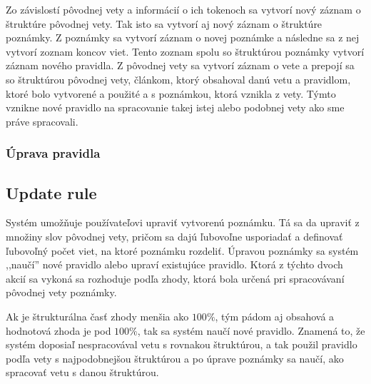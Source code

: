 Zo závislostí pôvodnej vety a informácií o ich tokenoch sa vytvorí nový záznam o štruktúre pôvodnej vety. Tak isto sa vytvorí aj nový záznam o štruktúre poznámky. Z poznámky sa vytvorí záznam o novej poznámke a následne sa z nej vytvorí zoznam koncov viet. Tento zoznam spolu so štruktúrou poznámky vytvorí záznam nového pravidla. Z pôvodnej vety sa vytvorí záznam o vete a prepojí sa so štruktúrou pôvodnej vety, článkom, ktorý obsahoval danú vetu a pravidlom, ktoré bolo vytvorené a použité a s poznámkou, ktorá vznikla z vety. Týmto vznikne nové pravidlo na spracovanie takej istej alebo podobnej vety ako sme práve spracovali.



%
%
{
	\subsubsection{Úprava pravidla}
}
{
	\subsection{Update rule}
}
\label{subsubsection:rule_update}
Systém umožňuje používateľovi upraviť vytvorenú poznámku. Tá sa da upraviť z množiny slov pôvodnej vety, pričom sa dajú ľubovoľne usporiadať a definovať ľubovoľný počet viet, na ktoré poznámku rozdeliť. Úpravou poznámky sa systém ,,naučí'' nové pravidlo alebo upraví existujúce pravidlo. Ktorá z týchto dvoch akcií sa vykoná sa rozhoduje podľa zhody, ktorá bola určená pri spracovávaní pôvodnej vety poznámky. 

Ak je štrukturálna časť zhody  menšia ako $100\%$, tým pádom aj obsahová a hodnotová zhoda je pod $100\%$, tak sa systém naučí nové pravidlo. Znamená to, že systém doposiaľ nespracovával vetu s rovnakou štruktúrou, a tak použil pravidlo podľa vety s najpodobnejšou štruktúrou a po úprave poznámky sa naučí, ako spracovať vetu s danou štruktúrou.

